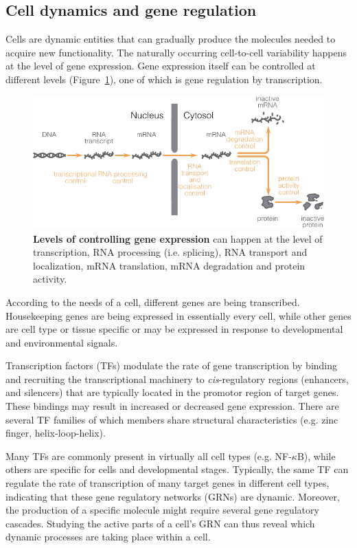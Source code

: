 \subsection{Cell dynamics and gene regulation}
Cells are dynamic entities that can gradually produce the molecules needed to acquire new functionality. The naturally occurring cell-to-cell variability happens at the level of gene expression. Gene expression itself can be controlled at different levels (Figure~\ref{fig:controlexpression}), one of which is gene regulation by transcription.

\begin{figure}[ht!]
	\centering
	\includegraphics[width=\linewidth]{fig/control_gene_expression}
	\caption{
		\textbf{Levels of controlling gene expression} can happen at the level of transcription, RNA processing (i.e. splicing), RNA transport and localization, mRNA translation, mRNA degradation and protein activity\cite{alberts_overviewgenecontrol_2002}.
	}
	\label{fig:controlexpression}
\end{figure}

According to the needs of a cell, different genes are being transcribed. Housekeeping genes are being expressed in essentially every cell, while other genes are cell type or tissue specific or may be expressed in response to developmental and environmental signals\cite{strachan_humanmoleculargenetics_2011}. 

Transcription factors (TFs) modulate the rate of gene transcription by binding and recruiting the transcriptional machinery to \emph{cis}-regulatory regions (enhancers, and silencers) that are typically located in the promotor region of target genes. These bindings may result in increased or decreased gene expression. 
There are several TF families of which members share structural characteristics (e.g. zinc finger, helix-loop-helix).

Many TFs are commonly present in virtually all cell types (e.g. NF-$\kappa$B), while others are specific for cells and developmental stages\cite{lambert_humantranscriptionfactors_2018}. Typically, the same TF can regulate the rate of transcription of many target genes in different cell types, indicating that these gene regulatory networks (GRNs) are dynamic. Moreover, the production of a specific molecule might require several gene regulatory cascades. Studying the active parts of a cell's GRN can thus reveal which dynamic processes are taking place within a cell.

